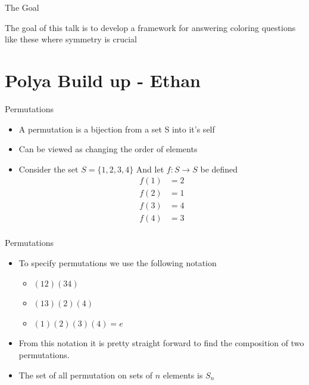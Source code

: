 \documentclass{beamer}
\begin{document}
\begin{frame}{The Goal}
	
    The goal of this talk is to develop a framework for 
    answering coloring questions like these where symmetry
    is crucial
\end{frame}

\section{Polya Build up - Ethan} 

\begin{frame}{Permutations}
	\begin{itemize}
	\item A permutation is a bijection from a set S into it's self
    \item Can be viewed as changing the order of elements
    \item Consider the set $S = \{1,2,3,4\}$ And let $f : S \to S$ be defined
    \begin{align*}
    	f(1) &= 2 \\
        f(2) &= 1 \\
        f(3) &= 4 \\
        f(4) &= 3 \\
    \end{align*}
	\end{itemize}
\end{frame}

\begin{frame}{Permutations}
	\begin{itemize}
	\item To specify permutations we use the following notation
    	\begin{itemize}
    	\item $(12)(34)$ 
    	\item $(13)(2)(4)$
    	\item $(1)(2)(3)(4) = e$
    	\end{itemize}
    \item From this notation it is pretty straight forward to find the composition of 
    	  two permutations. 
    \item The set of all permutation on sets of $n$ elements is $S_n$
	\end{itemize}
\end{frame}
\end{document}
